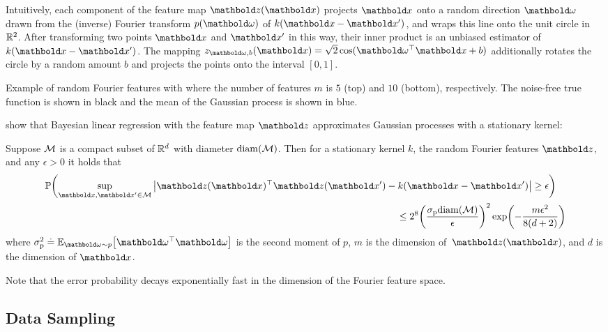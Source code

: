 Intuitively, each component of the feature map $\vz(\vx)$ projects $\vx$ onto a random direction $\vomega$ drawn from the (inverse) Fourier transform $p(\vomega)$ of $k(\vx-\vxp)$, and wraps this line onto the unit circle in $\mathbb{R}^2$.
After transforming two points $\vx$ and $\vxp$ in this way, their inner product is an unbiased estimator of $k(\vx - \vxp)$.
The mapping $z_{\vomega,b}(\vx) = \sqrt{2} \cos(\transpose{\vomega} \vx + b)$ additionally rotates the circle by a random amount $b$ and projects the points onto the interval $[0,1]$.

\begin{marginfigure}
  \caption{Example of random Fourier features with where the number of features $m$ is $5$ (top) and $10$ (bottom), respectively.
  The noise-free true function is shown in black and the mean of the Gaussian process is shown in blue.}
\end{marginfigure}

\cite{rff} show that Bayesian linear regression with the feature map $\vz$ approximates Gaussian processes with a stationary kernel:

\begin{thm}\label{thm:uniform_convergence_fourier_features}
  Suppose $\mathcal{M}$ is a compact subset of $\mathbb{R}^d$ with diameter $\mathrm{diam}(\mathcal{M})$.
  Then for a stationary kernel $k$, the random Fourier features $\vz$, and any $\epsilon > 0$ it holds that \begin{align}
    \begin{multlined}[t]
      \Pr{\sup_{\vx,\vxp \in \spM} \abs{\transpose{\vz(\vx)} \vz(\vxp) - k(\vx - \vxp)} \geq \epsilon} \\
      \leq 2^8 \parentheses*{\frac{\sigmap \mathrm{diam}(\spM)}{\epsilon}}^2 \exp\parentheses*{-\frac{m \epsilon^2}{8(d + 2)}}
    \end{multlined}
  \end{align} where $\sigmap^2 \defeq \E[\vomega \sim p]{\transpose{\vomega} \vomega}$ is the second moment of $p$, $m$ is the dimension of~$\vz(\vx)$, and $d$ is the dimension of $\vx$. 
\end{thm}

Note that the error probability decays exponentially fast in the dimension of the Fourier feature space.






\subsection{Data Sampling}\label{sec:gp:approx:data_sampling}

